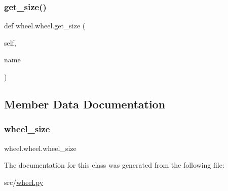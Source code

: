 \subsubsection{\texorpdfstring{get\+\_\+size()}{get\_size()}}
{\footnotesize\ttfamily def wheel.\+wheel.\+get\+\_\+size (\begin{DoxyParamCaption}\item[{}]{self,  }\item[{}]{name }\end{DoxyParamCaption})}



\subsection{Member Data Documentation}
\mbox{\label{classwheel_1_1wheel_ad2bdaadaaf22bc7522c6c579e9c2d6d8}} 
\subsubsection{\texorpdfstring{wheel\+\_\+size}{wheel\_size}}
{\footnotesize\ttfamily wheel.\+wheel.\+wheel\+\_\+size}



The documentation for this class was generated from the following file\+:\begin{DoxyCompactItemize}
\item 
src/\hyperlink{wheel_8py}{wheel.\+py}\end{DoxyCompactItemize}
